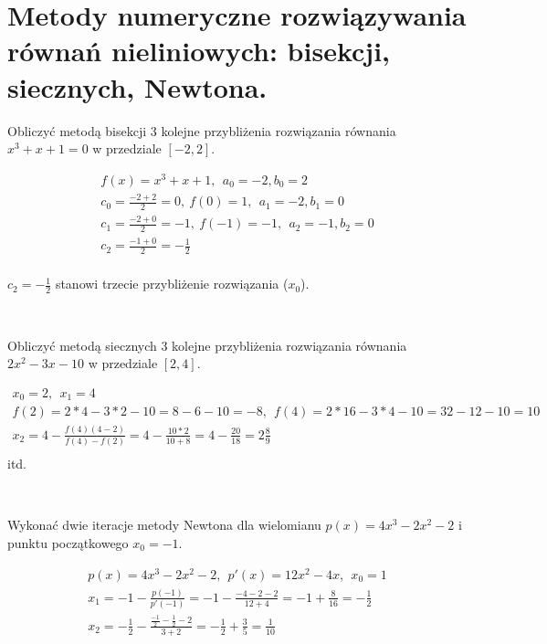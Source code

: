 \documentclass[main.tex]{subfiles}
\begin{document}
    \newpage

    \section{Metody numeryczne rozwiązywania równań nieliniowych: bisekcji, siecznych, Newtona.}

    \begin{exercise}
        Obliczyć metodą bisekcji 3 kolejne przybliżenia rozwiązania równania $x^3 + x + 1 = 0$ w przedziale $[-2, 2]$.
    \end{exercise}

    \begin{gather*}
        f(x) = x^3 + x + 1, ~~ a_0 = -2, b_0 = 2\\
        c_0 = \frac{-2+2}{2} = 0, ~ f(0) = 1, ~~ a_1 = -2, b_1 = 0\\
        c_1 = \frac{-2+0}{2} = -1, ~ f(-1) = -1, ~~ a_2 = -1, b_2 = 0\\
        c_2 = \frac{-1+0}{2} = -\frac{1}{2}\\
    \end{gather*}

    $c_2 = -\frac{1}{2}$ stanowi trzecie przybliżenie rozwiązania ($x_0$).

    \hfill \\

    \begin{exercise}
        Obliczyć metodą siecznych 3 kolejne przybliżenia rozwiązania równania $2x^2 - 3x - 10$ w przedziale $[2, 4]$.
    \end{exercise}
    \begin{gather*}
        x_0 = 2, ~~ x_1 = 4\\
        f(2) = 2*4 - 3*2 - 10 = 8 - 6 - 10 = -8, ~~ f(4) = 2*16 - 3*4 - 10 = 32 - 12 - 10 = 10\\
        x_2 = 4 - \frac{f(4)(4-2)}{f(4) - f(2)} = 4 - \frac{10*2}{10 + 8} = 4 - \frac{20}{18} = 2 \frac{8}{9}\\
    \end{gather*}
    itd.

    \hfill \\

    \begin{exercise}
        Wykonać dwie iteracje metody Newtona dla wielomianu $p(x) = 4x^3 - 2x^2 - 2$ i punktu początkowego $x_0 = -1$.
    \end{exercise}

    \begin{gather*}
        p(x) = 4x^3 - 2x^2 - 2, ~~ p'(x) = 12x^2 - 4x, ~~ x_0 = 1\\
        x_1 = -1 - \frac{p(-1)}{p'(-1)} = -1 - \frac{-4-2-2}{12+4} = -1 + \frac{8}{16}  = -\frac{1}{2}\\
        x_2 = -\frac{1}{2} - \frac{\frac{-1}{2} - \frac{1}{2} - 2}{3 + 2} = -\frac{1}{2} + \frac{3}{5} = \frac{1}{10}\\
    \end{gather*}
\end{document}
